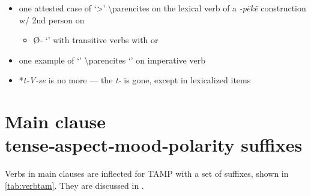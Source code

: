 \documentclass{memoir}
\begin{document}
\xe

\begin{itemize}
\item
  one attested case of  `\textgreater{}'
  \textbackslash parencites on the lexical verb of a \emph{-pëkë}
  construction w/ 2nd person  on 

  \begin{itemize}
  \tightlist
  \item
    Ø‑ `' with transitive verbs with  or
  \end{itemize}
\item
  one example of  `' \textbackslash parencites
  `' on imperative verb
\item
  *\emph{t‑V‑se} is no more --- the \emph{t‑} is gone, except in
  lexicalized items
\end{itemize}

\section{\texorpdfstring{Main clause tense‑aspect‑mood‑polarity suffixes
\label{sec:tam}}{Main clause tense‑aspect‑mood‑polarity suffixes }}

Verbs in main clauses are inflected for TAMP with a set of suffixes,
shown in \cref{tab:verbtam}. They are discussed in
.
\end{document}

